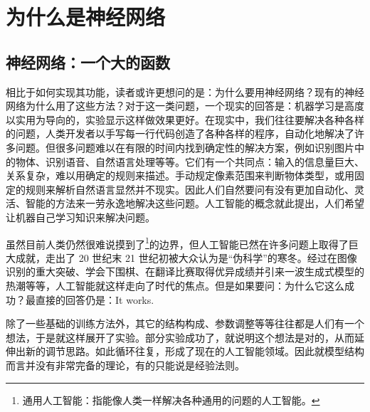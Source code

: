 \section{为什么是神经网络}
\subsection{神经网络：一个大的函数}

相比于如何实现其功能，读者或许更想问的是：为什么要用神经网络？现有的神经网络为什么用了这些方法？对于这一类问题，一个现实的回答是：机器学习是高度以实用为导向的，实验显示这样做效果更好。在现实中，我们往往要解决各种各样的问题，人类开发者以手写每一行代码创造了各种各样的程序，自动化地解决了许多问题。但很多问题难以在有限的时间内找到确定性的解决方案，例如识别图片中的物体、识别语音、自然语言处理等等。它们有一个共同点：输入的信息量巨大、关系复杂，难以用确定的规则来描述。手动规定像素范围来判断物体类型，或用固定的规则来解析自然语言显然并不现实。因此人们自然要问有没有更加自动化、灵活、智能的方法来一劳永逸地解决这些问题。人工智能的概念就此提出，人们希望让机器自己学习知识来解决问题。

虽然目前人类仍然很难说摸到了\footnote{通用人工智能：指能像人类一样解决各种通用的问题的人工智能。}的边界，但人工智能已然在许多问题上取得了巨大成就，走出了 20 世纪末 21 世纪初被大众认为是“伪科学”的寒冬。经过在图像识别的重大突破、学会下围棋、在翻译比赛取得优异成绩并引来一波生成式模型的热潮等等，人工智能就这样走向了时代的焦点。但是如果要问：为什么它这么成功？最直接的回答仍是：It works.

除了一些基础的训练方法外，其它的结构构成、参数调整等等往往都是人们有一个想法，于是就这样展开了实验。部分实验成功了，就说明这个想法是对的，从而延伸出新的调节思路。如此循环往复，形成了现在的人工智能领域。因此就模型结构而言并没有非常完备的理论，有的只能说是经验法则。

